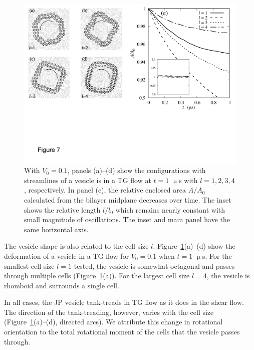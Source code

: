\documentclass[prb,preprint,showpacs,preprintnumbers,amsmath,amssymb,longbibliography]{revtex4-1}
\begin{document}
\begin{figure}
  \begin{center}
\includegraphics[width=1.0\textwidth]{Figures/Figure7.pdf}
  \end{center}
  \vspace{-20pt}  
  \caption{\label{fig:BTG_Scale} With $V_0=0.1$, panels (a)--(d) show
  the configurations with streamlines of a vesicle is in a TG flow at
  $t=1$ $\upmu$s with $l= 1,2,3,4$, respectively. In panel (e), the
  relative enclosed area $A/A_0$ calculated from the bilayer midplane
  decreases over time. The inset shows the relative length $l/l_0$ which
  remains nearly constant with small magnitude of oscillations. The
  inset and main panel have the same horizontal axis.}
\end{figure}

The vesicle shape is also related to the cell size $l$.
Figure~\ref{fig:BTG_Scale}(a)--(d) show the deformation of a vesicle in
a TG flow for $V_0=0.1$ when $t = 1$ $\upmu$s. For the smallest cell
size $l = 1$ tested, the vesicle is somewhat octagonal and passes
through multiple cells (Figure~\ref{fig:BTG_Scale}(a)). For the largest
cell size $l = 4$, the vesicle is rhomboid and surrounds a single cell. 

In all cases, the JP vesicle tank-treads in TG flow as it does
in the shear flow. The
direction of the tank-treading, however, varies with the cell size
(Figure~\ref{fig:BTG_Scale}(a)--(d), directed arcs). We attribute this
change in rotational orientation to the total rotational moment of the
cells that the vesicle passes through.
\end{document}
